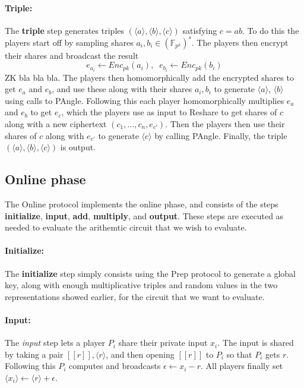 \documentclass{article}
\begin{document}
\paragraph{Triple:}
The \textbf{triple} step generates triples $(\langle a \rangle, \langle b \rangle, \langle c \rangle)$ satisfying $c = ab$. To do this the players start off by sampling shares $a_i, b_i \in (\mathbb{F}_{p^k})^s$.
The players then encrypt their shares and broadcast the result $$e_{a_i} \leftarrow Enc_{pk}(a_i), \;\; e_{b_i} \leftarrow Enc_{pk}(b_i)$$
ZK bla bla bla.
The players then homomorphically add the encrypted shares to get $e_a$ and $e_b$, and use these along with their shares $a_i, b_i$ to generate $\langle a \rangle$, $\langle b \rangle$ using calls to PAngle.
Following this each player homomorphically multiplies $e_a$ and $e_b$ to get $e_c$, which the players use as input to Reshare to get shares of $c$ along with a new ciphertext $(c_1, ..., c_n, e_{c'})$. Then the players then use their shares of $c$ along with $e_{c'}$ to generate $\langle c \rangle$ by calling PAngle. Finally, the triple $(\langle a \rangle, \langle b \rangle, \langle c \rangle)$ is output.


\subsection{Online phase} \label{Online}
The Online protocol implements the online phase, 
and consists of the steps \textbf{initialize}, \textbf{input}, \textbf{add}, \textbf{multiply}, and \textbf{output}. These steps are executed as needed to evaluate the arithemtic circuit that we wish to evaluate.

\paragraph{Initialize:} The \textbf{initialize} step simply consists using the Prep protocol to generate a global key, along with enough multiplicative triples and random values in the two representations showed earlier, for the circuit that we want to evaluate.

\paragraph{Input:} The \textit{input} step lets a player $P_i$ share their private input $x_i$. The input is shared by taking a pair $[\![ r ]\!], \langle r \rangle$, and then opening $[\![ r ]\!]$ to $P_i$ so that $P_i$ gets $r$. Following this $P_i$ computes and broadcasts $\epsilon \leftarrow x_i - r$. All players finally set $\langle x_i \rangle \leftarrow \langle r \rangle + \epsilon$. %
\end{document}
